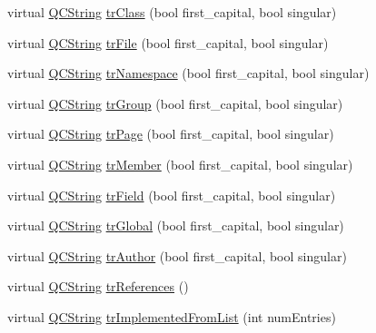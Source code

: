 \begin{DoxyCompactItemize}
\item 
virtual \mbox{\hyperlink{class_q_c_string}{Q\+C\+String}} \mbox{\hyperlink{class_translator_norwegian_ab275874b6bcba054f4ec80882fc5702a}{tr\+Class}} (bool first\+\_\+capital, bool singular)
\item 
virtual \mbox{\hyperlink{class_q_c_string}{Q\+C\+String}} \mbox{\hyperlink{class_translator_norwegian_acca696930b1f69826a09951a73821da6}{tr\+File}} (bool first\+\_\+capital, bool singular)
\item 
virtual \mbox{\hyperlink{class_q_c_string}{Q\+C\+String}} \mbox{\hyperlink{class_translator_norwegian_ab644f977790ca08fbe30dafdd38f2811}{tr\+Namespace}} (bool first\+\_\+capital, bool singular)
\item 
virtual \mbox{\hyperlink{class_q_c_string}{Q\+C\+String}} \mbox{\hyperlink{class_translator_norwegian_ae1755967842766f8fc246e1afd7964c2}{tr\+Group}} (bool first\+\_\+capital, bool singular)
\item 
virtual \mbox{\hyperlink{class_q_c_string}{Q\+C\+String}} \mbox{\hyperlink{class_translator_norwegian_a9b294332989e3394163b0631a9f09759}{tr\+Page}} (bool first\+\_\+capital, bool singular)
\item 
virtual \mbox{\hyperlink{class_q_c_string}{Q\+C\+String}} \mbox{\hyperlink{class_translator_norwegian_a0ef9f079ffda230be8149e31c1a32137}{tr\+Member}} (bool first\+\_\+capital, bool singular)
\item 
virtual \mbox{\hyperlink{class_q_c_string}{Q\+C\+String}} \mbox{\hyperlink{class_translator_norwegian_abfb0cb97df1bd5efb23308a6fb62ebcd}{tr\+Field}} (bool first\+\_\+capital, bool singular)
\item 
virtual \mbox{\hyperlink{class_q_c_string}{Q\+C\+String}} \mbox{\hyperlink{class_translator_norwegian_a8e11944b49ebc8039a1b572b550f9018}{tr\+Global}} (bool first\+\_\+capital, bool singular)
\item 
virtual \mbox{\hyperlink{class_q_c_string}{Q\+C\+String}} \mbox{\hyperlink{class_translator_norwegian_a8e2984e98ca9a2275203aa1a74dc9989}{tr\+Author}} (bool first\+\_\+capital, bool singular)
\item 
virtual \mbox{\hyperlink{class_q_c_string}{Q\+C\+String}} \mbox{\hyperlink{class_translator_norwegian_a57b022c381ab342200d6238488b2e4a5}{tr\+References}} ()
\item 
virtual \mbox{\hyperlink{class_q_c_string}{Q\+C\+String}} \mbox{\hyperlink{class_translator_norwegian_a0644c1c4b880ed462d96876938c96627}{tr\+Implemented\+From\+List}} (int num\+Entries)
\item 

\end{DoxyCompactItemize}
